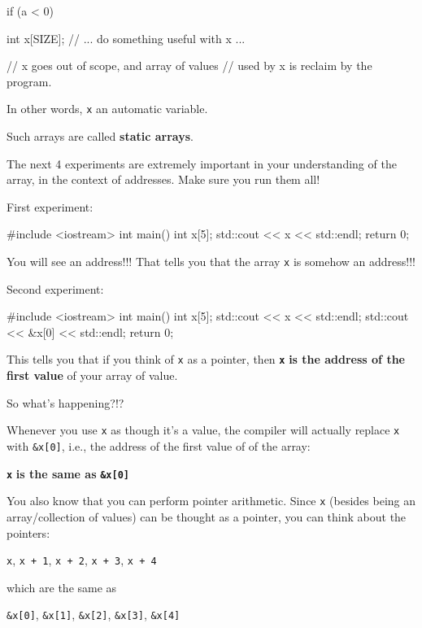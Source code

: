 \begin{consolethree}[escapeinside=||]
if (a < 0)
{
    int x[SIZE];
    // ... do something useful with x ...

} // x goes out of scope, and array of values
  // used by x is reclaim by the program.
\end{consolethree}

In other words, \texttt{x} an automatic variable.

Such arrays are called \textbf{static arrays}.

The next 4 experiments are extremely important in your understanding of
the array, in the context of addresses. Make sure you run them all!

First experiment:

\begin{consolethree}[escapeinside=||]
#include <iostream>
int main()
{
    int x[5];
    std::cout << x << std::endl;
    return 0;
}
\end{consolethree}

You will see an address!!! That tells you that the array \texttt{x} is
somehow an address!!!

Second experiment:

\begin{consolethree}[escapeinside=||]
#include <iostream>
int main()
{
    int x[5];
    std::cout << x << std::endl;
    std::cout << &x[0] << std::endl;
    return 0;
}
\end{consolethree}

This tells you that if you think of \texttt{x} as a pointer, then
\texttt{\textbf{x}}\textbf{ is the address of the first value }of your
array of value.

So what's happening?!?

Whenever you use \texttt{x} as though it's a value, the
compiler will actually replace \texttt{x} with \texttt{\&x[0]}, i.e.,
the address of the first value of of the array:

\texttt{\textbf{x}}\textbf{ is the same as }\texttt{\textbf{\&x[0]}}

You also know that you can perform pointer arithmetic. Since \texttt{x}
(besides being an array/collection of values) can be thought as a
pointer, you can think about the pointers:

\texttt{x}, \texttt{x + 1}, \texttt{x + 2}, \texttt{x + 3}, \texttt{x + 4}

which are the same as

\texttt{\&x[0]}, \texttt{\&x[1]}, \texttt{\&x[2]},
\texttt{\&x[3]}, \texttt{\&x[4]}

